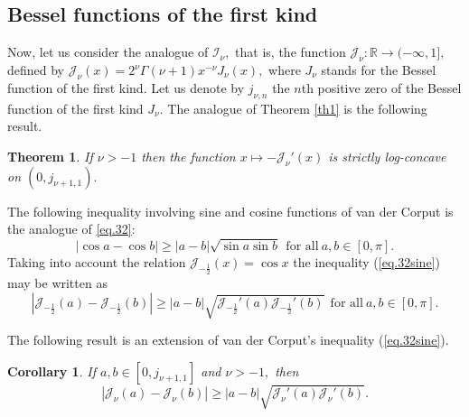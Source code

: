 \documentclass[10pt]{amsart}
\newtheorem{theorem}{Theorem}
\newtheorem{corollary}{Corollary}
\begin{document}
\subsection{Bessel functions of the first kind} Now, let us consider the analogue of $\mathcal{I}_{\nu},$ that is, the function $\mathcal{J}_{\nu}:\mathbb{R}\to (-\infty,1],$ defined by $\mathcal{J}_{\nu}(x)=2^{\nu}\Gamma(\nu+1)x^{-\nu}J_{\nu}(x),$ where $J_{\nu}$ stands for the Bessel function of the first kind. Let us denote by $j_{\nu,n}$ the $n$th positive zero of the Bessel function of the first kind $J_{\nu}.$ The analogue of Theorem \ref{th1} is the following result.

\begin{theorem}\label{th1bessel}
If $\nu>-1$ then the function $x\mapsto-\mathcal{J}_{\nu}'(x)$ is strictly log-concave on $(0,j_{\nu+1,1}).$
\end{theorem}

The following inequality involving sine and
cosine functions of van der Corput \cite[p. 237]{mi} is the analogue of \eqref{eq.32}: \begin{equation}\label{eq.32sine}|\cos a
-\cos b|\geq |a-b|\sqrt{\sin a \sin b}\ \ \mbox{for all}\
a,b\in [0,\pi].\end{equation} Taking into account the relation
$\mathcal{J}_{-\frac{1}{2}}(x)=\cos x$ the inequality (\ref{eq.32sine}) may
be written as
$$|\mathcal{J}_{-\frac{1}{2}}(a)-\mathcal{J}_{-\frac{1}{2}}(b)|\geq
|a-b|\sqrt{\mathcal{J}_{-\frac{1}{2}}'(a)\mathcal{J}_{-\frac{1}{2}}'(b)}\ \
\mbox{for all}\ a,b\in [0,\pi].$$

The following result is an extension of van der Corput's
inequality (\ref{eq.32sine}).

\begin{corollary}\label{th2bessel}
If $a,b\in[0,j_{\nu+1,1}]$ and $\nu>-1,$ then
\begin{equation}\label{eq.34bessel}|\mathcal{J}_{\nu}(a)-\mathcal{J}_{\nu}(b)|\geq
|a-b|\sqrt{\mathcal{J}_{\nu}'(a)\mathcal{J}_{\nu}'(b)}.\end{equation}
\end{corollary}
\end{document}
